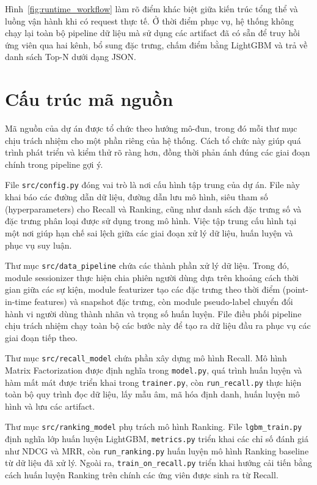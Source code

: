 Hình~\ref{fig:runtime_workflow} làm rõ điểm khác biệt giữa kiến trúc tổng thể và luồng vận hành khi có request thực tế. Ở thời điểm phục vụ, hệ thống không chạy lại toàn bộ pipeline dữ liệu mà sử dụng các artifact đã có sẵn để truy hồi ứng viên qua hai kênh, bổ sung đặc trưng, chấm điểm bằng LightGBM và trả về danh sách Top-N dưới dạng JSON.

\section{Cấu trúc mã nguồn}
Mã nguồn của dự án được tổ chức theo hướng mô-đun, trong đó mỗi thư mục chịu trách nhiệm cho một phần riêng của hệ thống. Cách tổ chức này giúp quá trình phát triển và kiểm thử rõ ràng hơn, đồng thời phản ánh đúng các giai đoạn chính trong pipeline gợi ý.
\medskip

File \texttt{src/config.py} đóng vai trò là nơi cấu hình tập trung của dự án. File này khai báo các đường dẫn dữ liệu, đường dẫn lưu mô hình, siêu tham số (hyperparameters) cho Recall và Ranking, cũng như danh sách đặc trưng số và đặc trưng phân loại được sử dụng trong mô hình. Việc tập trung cấu hình tại một nơi giúp hạn chế sai lệch giữa các giai đoạn xử lý dữ liệu, huấn luyện và phục vụ suy luận.
\medskip

Thư mục \texttt{src/data\_pipeline} chứa các thành phần xử lý dữ liệu. Trong đó, module sessionizer thực hiện chia phiên người dùng dựa trên khoảng cách thời gian giữa các sự kiện, module featurizer tạo các đặc trưng theo thời điểm (point-in-time features) và snapshot đặc trưng, còn module pseudo-label chuyển đổi hành vi người dùng thành nhãn và trọng số huấn luyện. File điều phối pipeline chịu trách nhiệm chạy toàn bộ các bước này để tạo ra dữ liệu đầu ra phục vụ các giai đoạn tiếp theo.
\medskip

Thư mục \texttt{src/recall\_model} chứa phần xây dựng mô hình Recall. Mô hình Matrix Factorization được định nghĩa trong \texttt{model.py}, quá trình huấn luyện và hàm mất mát được triển khai trong \texttt{trainer.py}, còn \texttt{run\_recall.py} thực hiện toàn bộ quy trình đọc dữ liệu, lấy mẫu âm, mã hóa định danh, huấn luyện mô hình và lưu các artifact.
\medskip

Thư mục \texttt{src/ranking\_model} phụ trách mô hình Ranking. File \texttt{lgbm\_train.py} định nghĩa lớp huấn luyện LightGBM, \texttt{metrics.py} triển khai các chỉ số đánh giá như NDCG và MRR, còn \texttt{run\_ranking.py} huấn luyện mô hình Ranking baseline từ dữ liệu đã xử lý. Ngoài ra, \texttt{train\_on\_recall.py} triển khai hướng cải tiến bằng cách huấn luyện Ranking trên chính các ứng viên được sinh ra từ Recall.
\medskip

